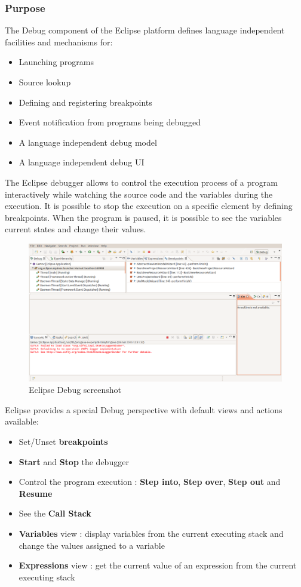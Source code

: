 \documentclass{gemoc} %
\begin{document}
\subsubsection{Purpose}
The Debug component of the Eclipse platform defines language independent facilities and mechanisms for:
\begin{itemize}
\item Launching programs
\item Source lookup
\item Defining and registering breakpoints
\item Event notification from programs being debugged
\item A language independent debug model
\item A language independent debug UI
\end{itemize}

The Eclipse debugger allows to control the execution process of a program interactively while watching the source code and the variables during the execution. It is possible to stop the execution on a specific element by defining breakpoints. When the program is paused, it is possible to see the variables current states and change their values.
\begin{figure}[h]
	\begin{center}
	\includegraphics*[trim=0.0cm 0.0cm 0cm 0.0cm, clip=true, width=1.0\linewidth]{../images/EclipseDebugPerspective.png}
	\caption{Eclipse Debug screenshot}
	\end{center}
\end{figure}

Eclipse provides a special Debug perspective with default views and actions available:
\begin{itemize}
\item Set/Unset \textbf{breakpoints}
\item \textbf{Start} and \textbf{Stop} the debugger
\item Control the program execution : \textbf{Step into}, \textbf{Step over}, \textbf{Step out} and \textbf{Resume}
\item See the \textbf{Call Stack}
\item \textbf{Variables} view : display variables from the current executing stack and change the values assigned to a variable
\item \textbf{Expressions} view : get the current value of an expression from the current executing stack
\end{itemize}
\end{document}

